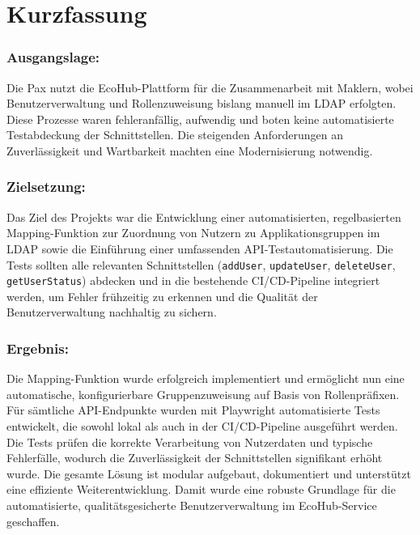 \chapter{Kurzfassung}
\vspace{-3em}

\subsection*{Ausgangslage:}
Die Pax nutzt die EcoHub-Plattform für die Zusammenarbeit mit Maklern, wobei Benutzerverwaltung und Rollenzuweisung bislang manuell im LDAP erfolgten. Diese Prozesse waren fehleranfällig, aufwendig und boten keine automatisierte Testabdeckung der Schnittstellen. Die steigenden Anforderungen an Zuverlässigkeit und Wartbarkeit machten eine Modernisierung notwendig.

\subsection*{Zielsetzung:}
Das Ziel des Projekts war die Entwicklung einer automatisierten, regelbasierten Mapping-Funktion zur Zuordnung von Nutzern zu Applikationsgruppen im LDAP sowie die Einführung einer umfassenden API-Testautomatisierung. Die Tests sollten alle relevanten Schnittstellen (\texttt{addUser}, \texttt{updateUser}, \texttt{deleteUser}, \texttt{getUserStatus}) abdecken und in die bestehende CI/CD-Pipeline integriert werden, um Fehler frühzeitig zu erkennen und die Qualität der Benutzerverwaltung nachhaltig zu sichern.

\subsection*{Ergebnis:}
Die Mapping-Funktion wurde erfolgreich implementiert und ermöglicht nun eine automatische, konfigurierbare Gruppenzuweisung auf Basis von Rollenpräfixen. Für sämtliche API-Endpunkte wurden mit Playwright automatisierte Tests entwickelt, die sowohl lokal als auch in der CI/CD-Pipeline ausgeführt werden. Die Tests prüfen die korrekte Verarbeitung von Nutzerdaten und typische Fehlerfälle, wodurch die Zuverlässigkeit der Schnittstellen signifikant erhöht wurde. Die gesamte Lösung ist modular aufgebaut, dokumentiert und unterstützt eine effiziente Weiterentwicklung. Damit wurde eine robuste Grundlage für die automatisierte, qualitätsgesicherte Benutzerverwaltung im EcoHub-Service geschaffen.